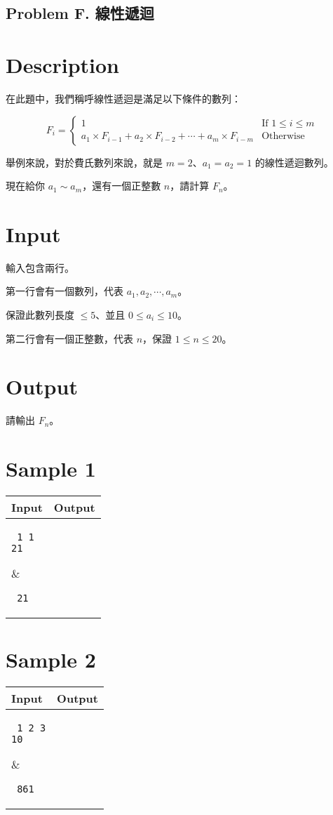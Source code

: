 \documentclass[11pt,a4paper]{article}
\begin{document}
 
\begin{center}
\section*{Problem F. 線性遞迴}
\end{center}
 
\section*{Description}
 
在此題中，我們稱呼線性遞迴是滿足以下條件的數列：

$$
F_i=\begin{cases}
1 & \text{If } 1\le i \le m \\
a_1\times F_{i-1} + a_2\times F_{i-2}+\cdots + a_m\times F_{i-m} & \text{Otherwise}
\end{cases}
$$

舉例來說，對於費氏數列來說，就是 $m=2$、$a_1 = a_2 = 1$ 的線性遞迴數列。

現在給你 $a_1\sim a_m$，還有一個正整數 $n$，請計算 $F_n$。
 
\section*{Input}
 
輸入包含兩行。

第一行會有一個數列，代表 $a_1, a_2, \cdots, a_m$。

保證此數列長度 $\le 5$、並且 $0\le a_i\le 10$。

第二行會有一個正整數，代表 $n$，保證 $1\le n\le 20$。
 
\section*{Output}
 
請輸出 $F_n$。

\section*{Sample 1}
\begin{longtable}[!h]{|p{}|p{}|}
\hline
\textbf {Input} & \textbf {Output} \\
\hline
\parbox[t]{0.5\textwidth}
{ \tt
1 1\\
21\\
 
} &
\parbox[t]{0.5\textwidth}
{ \tt
21\\

} \\
\hline
\end{longtable}

\section*{Sample 2}
\begin{longtable}[!h]{|p{}|p{}|}
\hline
\textbf {Input} & \textbf {Output} \\
\hline
\parbox[t]{0.5\textwidth}
{ \tt
1 2 3\\
10\\

} &
\parbox[t]{0.5\textwidth}
{ \tt
861\\

} \\
\hline
\end{longtable}
 
\end{document}
